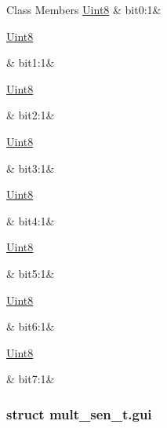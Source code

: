 \begin{DoxyFields}{Class Members}
\hypertarget{a00001_a4bd778c5ca1d20c6712fc3c43c180190}{\hyperlink{a00001_a979e3e23b9a449e69ab6a8a83b6042f8}{Uint8}}\label{a00001_a4bd778c5ca1d20c6712fc3c43c180190}
&
bit0\+:1&
\\
\hline

\hypertarget{a00001_aa0941e22a00ceb36e322f5a3ddf39bdf}{\hyperlink{a00001_a979e3e23b9a449e69ab6a8a83b6042f8}{Uint8}}\label{a00001_aa0941e22a00ceb36e322f5a3ddf39bdf}
&
bit1\+:1&
\\
\hline

\hypertarget{a00001_a7475e5eb03d1e898bcdd6ad329107947}{\hyperlink{a00001_a979e3e23b9a449e69ab6a8a83b6042f8}{Uint8}}\label{a00001_a7475e5eb03d1e898bcdd6ad329107947}
&
bit2\+:1&
\\
\hline

\hypertarget{a00001_a559eaa0cd92d657a70aec8d708a368e0}{\hyperlink{a00001_a979e3e23b9a449e69ab6a8a83b6042f8}{Uint8}}\label{a00001_a559eaa0cd92d657a70aec8d708a368e0}
&
bit3\+:1&
\\
\hline

\hypertarget{a00001_a3816eeaae590252d312683198d079f1b}{\hyperlink{a00001_a979e3e23b9a449e69ab6a8a83b6042f8}{Uint8}}\label{a00001_a3816eeaae590252d312683198d079f1b}
&
bit4\+:1&
\\
\hline

\hypertarget{a00001_a6c4b0946eda9d8ad8aaf78600bc1d597}{\hyperlink{a00001_a979e3e23b9a449e69ab6a8a83b6042f8}{Uint8}}\label{a00001_a6c4b0946eda9d8ad8aaf78600bc1d597}
&
bit5\+:1&
\\
\hline

\hypertarget{a00001_a5b857cdfb2f4c90ee462dbddc676474c}{\hyperlink{a00001_a979e3e23b9a449e69ab6a8a83b6042f8}{Uint8}}\label{a00001_a5b857cdfb2f4c90ee462dbddc676474c}
&
bit6\+:1&
\\
\hline

\hypertarget{a00001_a7f4477cea90f33056341ed6e1c0252e7}{\hyperlink{a00001_a979e3e23b9a449e69ab6a8a83b6042f8}{Uint8}}\label{a00001_a7f4477cea90f33056341ed6e1c0252e7}
&
bit7\+:1&
\\
\hline

\end{DoxyFields}
\label{db/dab/a00089}
\hypertarget{a00001_db/dab/a00089}{}
\subsubsection{struct mult\+\_\+sen\+\_\+t.\+gui}


